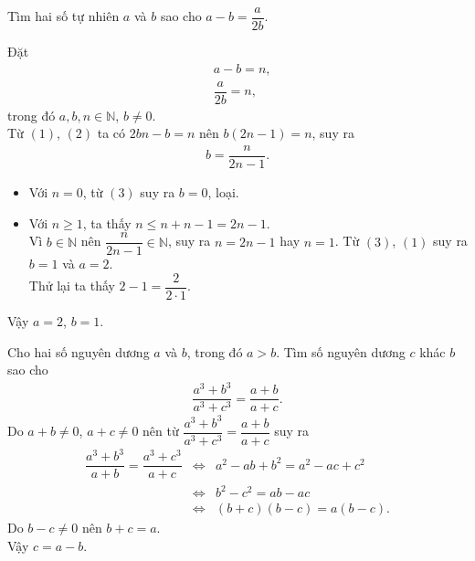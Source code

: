 \begin{bt}%
 Tìm hai số tự nhiên $a$ và $b$ sao cho $a-b=\dfrac{a}{2b}$.
 \loigiai
  {
  Đặt
  \allowdisplaybreaks
  \begin{align}
   & a-b=n, \tag{1}\\
   & \dfrac{a}{2b}=n,\tag{2}
  \end{align}
  trong đó $a,b,n\in\mathbb{N}$, $b\neq 0$.\\
  Từ $(1)$, $(2)$ ta có $2bn-b=n$ nên $b(2n-1)=n$, suy ra
   \begin{align}
  	b=\dfrac{n}{2n-1}.\tag{3}
   \end{align}
   \begin{itemize}
    \item Với $n=0$, từ $(3)$ suy ra $b=0$, loại.
    \item Với $n \geq 1$, ta thấy $n \leq n + n-1 = 2n-1$.\\
    Vì $b \in \mathbb{N}$ nên $\dfrac{n}{2n-1} \in\mathbb{N}$, suy ra $n=2n-1$ hay $n=1$. Từ $(3)$, $(1)$ suy ra $b=1$ và $a=2$.\\
    Thử lại ta thấy $2-1=\dfrac{2}{2 \cdot 1}$.
   \end{itemize}
  Vậy $a=2$, $b=1$.
  }
\end{bt}

\begin{bt}%
 Cho hai số nguyên dương $a$ và $b$, trong đó $a>b$. Tìm số nguyên dương $c$ khác $b$ sao cho 
 \begin{eqnarray*}
  \dfrac{a^3+b^3}{a^3+c^3} = \dfrac{a+b}{a+c}.
 \end{eqnarray*}
 \loigiai
  {
  Do $a+b \neq 0$, $a+c \neq 0$ nên từ $\dfrac{a^3+b^3}{a^3+c^3} = \dfrac{a+b}{a+c}$ suy ra
  \allowdisplaybreaks
  \begin{eqnarray*}
   \dfrac{a^3+b^3}{a+b} = \dfrac{a^3+c^3}{a+c} &\Leftrightarrow & a^2-ab+b^2=a^2-ac+c^2\\
   &\Leftrightarrow & b^2-c^2=ab-ac\\
   &\Leftrightarrow & (b+c)(b-c)=a(b-c).
  \end{eqnarray*}
  Do $b-c \neq 0$ nên $b+c=a$.\\
  Vậy $c=a-b$.
  }
\end{bt}

